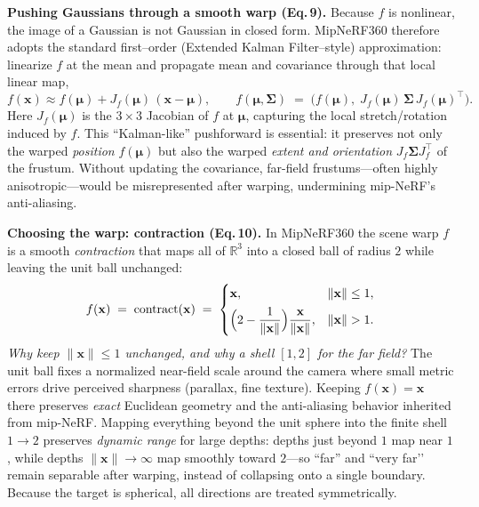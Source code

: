 \begin{enrichment}
\begin{enrichment}
        \textbf{Pushing Gaussians through a smooth warp (Eq.\,9).} Because $f$ is nonlinear, the image of a Gaussian is not Gaussian in closed form. MipNeRF360 therefore adopts the standard first–order (Extended Kalman Filter–style) approximation: linearize $f$ at the mean and propagate mean and covariance through that local linear map,
        \begin{equation}
            f(\mathbf{x}) \approx f(\boldsymbol\mu) + J_f(\boldsymbol\mu)\,(\mathbf{x}-\boldsymbol\mu),
            \qquad
            f(\boldsymbol\mu,\boldsymbol\Sigma) \;=\; \Big(f(\boldsymbol\mu),\; J_f(\boldsymbol\mu)\,\boldsymbol\Sigma\,J_f(\boldsymbol\mu)^\top\Big).
            \label{eq:linearize-push}
        \end{equation}
        Here $J_f(\boldsymbol\mu)$ is the $3{\times}3$ Jacobian of $f$ at $\boldsymbol\mu$, capturing the local stretch/rotation induced by $f$. This “Kalman-like” pushforward is essential: it preserves not only the warped \emph{position} $f(\boldsymbol\mu)$ but also the warped \emph{extent and orientation} $J_f\boldsymbol\Sigma J_f^\top$ of the frustum. Without updating the covariance, far-field frustums—often highly anisotropic—would be misrepresented after warping, undermining mip-NeRF’s anti-aliasing.
        
        \textbf{Choosing the warp: contraction (Eq.\,10).} In MipNeRF360 the scene warp $f$ is a smooth \emph{contraction} that maps all of $\mathbb{R}^3$ into a closed ball of radius $2$ while leaving the unit ball unchanged:
        \begin{equation}
            f(\mathbf{x}) \;=\; \operatorname{contract}(\mathbf{x}) \;=\;
            \begin{cases}
                \mathbf{x}, & \|\mathbf{x}\|\le 1,\\[4pt]
                \Bigl(2-\dfrac{1}{\|\mathbf{x}\|}\Bigr)\dfrac{\mathbf{x}}{\|\mathbf{x}\|}, & \|\mathbf{x}\|>1.
            \end{cases}
            \label{eq:contract}
        \end{equation}
        \emph{Why keep $\|\mathbf{x}\|\!\le\!1$ unchanged, and why a shell $[1,2]$ for the far field?} The unit ball fixes a normalized near-field scale around the camera where small metric errors drive perceived sharpness (parallax, fine texture). Keeping $f(\mathbf{x})=\mathbf{x}$ there preserves \emph{exact} Euclidean geometry and the anti-aliasing behavior inherited from mip-NeRF. Mapping everything beyond the unit sphere into the finite shell $1\!\to\!2$ preserves \emph{dynamic range} for large depths: depths just beyond $1$ map near $1$, while depths $\|\mathbf{x}\|\!\to\!\infty$ map smoothly toward $2$—so “far” and “very far’’ remain separable after warping, instead of collapsing onto a single boundary. Because the target is spherical, all directions are treated symmetrically.
        

\end{enrichment}
\end{enrichment}
